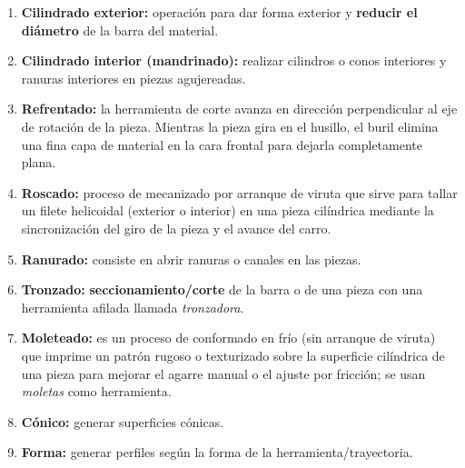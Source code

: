 \documentclass[12pt,a4paper]{article}
\begin{document}
\begin{enumerate}
	\item \textbf{Cilindrado exterior:} operación para dar forma exterior y
	      \textbf{reducir el diámetro} de la barra del material.
	\item \textbf{Cilindrado interior (mandrinado):} realizar cilindros o conos
	      interiores y ranuras interiores en piezas agujereadas.
	\item \textbf{Refrentado:} la herramienta de corte avanza en dirección
	      perpendicular al eje de rotación de la pieza. Mientras la pieza gira en
	      el husillo, el buril elimina una fina capa de material en la cara
	      frontal para dejarla completamente plana.
	\item \textbf{Roscado:} proceso de mecanizado por arranque de viruta que sirve
	      para tallar un filete helicoidal (exterior o interior) en una pieza
	      cilíndrica mediante la sincronización del giro de la pieza y el avance
	      del carro.
	\item \textbf{Ranurado:} consiste en abrir ranuras o canales en las piezas.
	\item \textbf{Tronzado:} \textbf{seccionamiento/corte} de la barra o de una
	      pieza con una herramienta afilada llamada \emph{tronzadora}.
	\item \textbf{Moleteado:} es un proceso de conformado en frío (sin arranque de
	      viruta) que imprime un patrón rugoso o texturizado sobre la superficie
	      cilíndrica de una pieza para mejorar el agarre manual o el ajuste por
	      fricción; se usan \emph{moletas} como herramienta.
	\item \textbf{Cónico:} generar superficies cónicas.
	\item \textbf{Forma:} generar perfiles según la forma de la
	      herramienta/trayectoria.
\end{enumerate}
\end{document}
